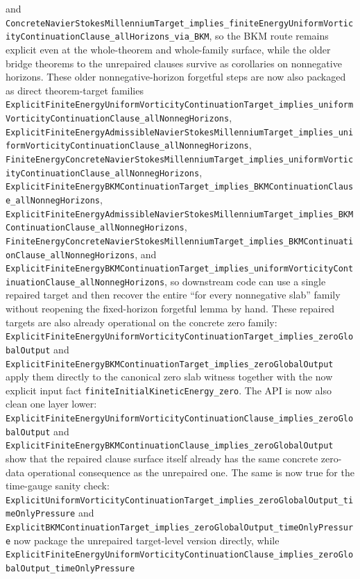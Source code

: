 \documentclass[11pt]{article}
\begin{document}
and
\texttt{ConcreteNavierStokesMillenniumTarget\_implies\_finiteEnergyUniformVorticityContinuationClause\_allHorizons\_via\_BKM},
so the BKM route remains explicit even at the whole-theorem and whole-family
surface,
while the older bridge theorems to the unrepaired clauses survive as corollaries
on nonnegative horizons.  These older nonnegative-horizon forgetful steps are
now also packaged as direct theorem-target families
\texttt{ExplicitFiniteEnergyUniformVorticityContinuationTarget\_implies\_uniformVorticityContinuationClause\_allNonnegHorizons},
\texttt{ExplicitFiniteEnergyAdmissibleNavierStokesMillenniumTarget\_implies\_uniformVorticityContinuationClause\_allNonnegHorizons},
\texttt{FiniteEnergyConcreteNavierStokesMillenniumTarget\_implies\_uniformVorticityContinuationClause\_allNonnegHorizons},
\texttt{ExplicitFiniteEnergyBKMContinuationTarget\_implies\_BKMContinuationClause\_allNonnegHorizons},
\texttt{ExplicitFiniteEnergyAdmissibleNavierStokesMillenniumTarget\_implies\_BKMContinuationClause\_allNonnegHorizons},
\texttt{FiniteEnergyConcreteNavierStokesMillenniumTarget\_implies\_BKMContinuationClause\_allNonnegHorizons},
and
\texttt{ExplicitFiniteEnergyBKMContinuationTarget\_implies\_uniformVorticityContinuationClause\_allNonnegHorizons},
so downstream code can use a single repaired target and then recover the entire
``for every nonnegative slab'' family without reopening the fixed-horizon
forgetful lemma by hand.  These repaired targets are also already operational on
the concrete zero family:
\texttt{ExplicitFiniteEnergyUniformVorticityContinuationTarget\_implies\_zeroGlobalOutput}
and
\texttt{ExplicitFiniteEnergyBKMContinuationTarget\_implies\_zeroGlobalOutput}
apply them directly to the canonical zero slab witness together with the now
explicit input fact \texttt{finiteInitialKineticEnergy\_zero}.  The API is now
also clean one layer lower:
\texttt{ExplicitFiniteEnergyUniformVorticityContinuationClause\_implies\_zeroGlobalOutput}
and
\texttt{ExplicitFiniteEnergyBKMContinuationClause\_implies\_zeroGlobalOutput}
show that the repaired clause surface itself already has the same concrete
zero-data operational consequence as the unrepaired one.  The same is now true
for the time-gauge sanity check:
\texttt{ExplicitUniformVorticityContinuationTarget\_implies\_zeroGlobalOutput\_timeOnlyPressure}
and
\texttt{ExplicitBKMContinuationTarget\_implies\_zeroGlobalOutput\_timeOnlyPressure}
now package the unrepaired target-level version directly, while
\texttt{ExplicitFiniteEnergyUniformVorticityContinuationClause\_implies\_zeroGlobalOutput\_timeOnlyPressure}
\end{document}
